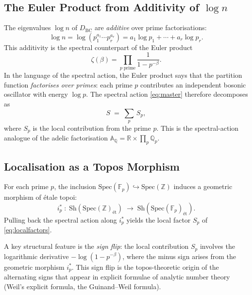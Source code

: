 \documentclass[11pt,a4paper]{article}
\begin{document}
\subsection{The Euler Product from Additivity of $\log n$}
\label{sec:euler}

The eigenvalues $\log n$ of $D_{\mathrm{BC}}$ are \emph{additive} over
prime factorisations:
\[
  \log n = \log(p_1^{a_1} \cdots p_r^{a_r})
  = a_1 \log p_1 + \cdots + a_r \log p_r.
\]
This additivity is the spectral counterpart of the Euler product
\[
  \zeta(\beta) = \prod_{p\;\mathrm{prime}} \frac{1}{1 - p^{-\beta}}.
\]
In the language of the spectral action, the Euler product says that the
partition function \emph{factorises over primes}: each prime $p$ contributes
an independent bosonic oscillator with energy $\log p$. The spectral action
\eqref{eq:master} therefore decomposes as
\begin{equation}\label{eq:localfactors}
  S \;=\; \sum_{p}\, S_p,
\end{equation}
where $S_p$ is the local contribution from the prime $p$. This is the
spectral-action analogue of the adelic factorisation $\mathbb{A}_{\mathbb{Q}}
= \mathbb{R} \times \prod_p \mathbb{Q}_p$.

\subsection{Localisation as a Topos Morphism}
\label{sec:localisation}

For each prime $p$, the inclusion $\mathrm{Spec}(\mathbb{F}_p) \hookrightarrow
\mathrm{Spec}(\mathbb{Z})$ induces a geometric morphism of \'etale topoi:
\[
  i_p^* \;:\; \mathrm{Sh}(\mathrm{Spec}(\mathbb{Z})_{\text{\'et}})
  \;\longrightarrow\;
  \mathrm{Sh}(\mathrm{Spec}(\mathbb{F}_p)_{\text{\'et}}).
\]
Pulling back the spectral action along $i_p^*$ yields the local factor $S_p$
of \eqref{eq:localfactors}.

A key structural feature is the \emph{sign flip}: the local contribution
$S_p$ involves the logarithmic derivative $-\log(1 - p^{-\beta})$, where the
minus sign arises from the geometric morphism $i_p^*$. This sign flip is the
topos-theoretic origin of the alternating signs that appear in explicit
formulae of analytic number theory (Weil's explicit formula, the
Guinand--Weil formula).
\end{document}
